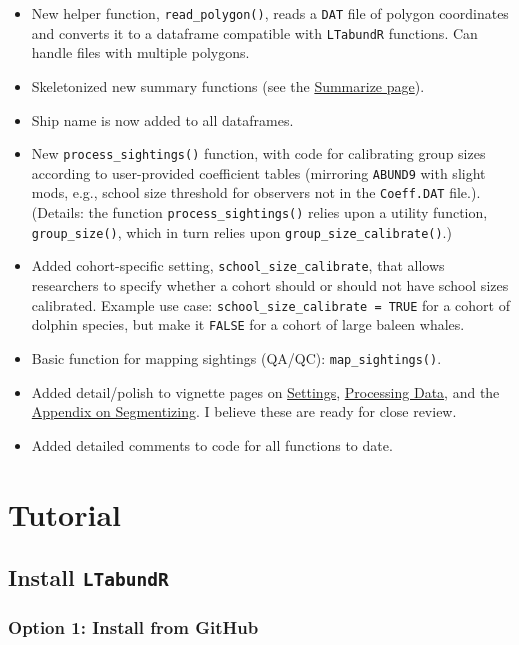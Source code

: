 \documentclass[
]{book}
\begin{document}
\begin{itemize}
\item
  New helper function, \texttt{read\_polygon()}, reads a \texttt{DAT} file of polygon coordinates and converts it to a dataframe compatible with \texttt{LTabundR} functions. Can handle files with multiple polygons.
\item
  Skeletonized new summary functions (see the \protect\hyperlink{summarize}{Summarize page}).
\item
  Ship name is now added to all dataframes.
\item
  New \texttt{process\_sightings()} function, with code for calibrating group sizes according to user-provided coefficient tables (mirroring \texttt{ABUND9} with slight mods, e.g., school size threshold for observers not in the \texttt{Coeff.DAT} file.). (Details: the function \texttt{process\_sightings()} relies upon a utility function, \texttt{group\_size()}, which in turn relies upon \texttt{group\_size\_calibrate()}.)
\item
  Added cohort-specific setting, \texttt{school\_size\_calibrate}, that allows researchers to specify whether a cohort should or should not have school sizes calibrated. Example use case: \texttt{school\_size\_calibrate\ =\ TRUE} for a cohort of dolphin species, but make it \texttt{FALSE} for a cohort of large baleen whales.
\item
  Basic function for mapping sightings (QA/QC): \texttt{map\_sightings()}.
\item
  Added detail/polish to vignette pages on \protect\hyperlink{settings}{Settings}, \protect\hyperlink{processing}{Processing Data}, and the \protect\hyperlink{segmentizing}{Appendix on Segmentizing}. I believe these are ready for close review.
\item
  Added detailed comments to code for all functions to date.
\end{itemize}

\hypertarget{part-tutorial}{%
\part{Tutorial}\label{part-tutorial}}

\hypertarget{install}{%
\chapter{\texorpdfstring{Install \texttt{LTabundR}}{Install LTabundR}}\label{install}}

\hypertarget{option-1-install-from-github}{%
\section*{Option 1: Install from GitHub}\label{option-1-install-from-github}}
\end{document}
